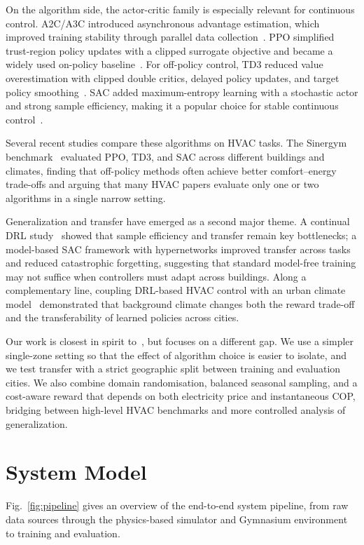 \documentclass[conference]{IEEEtran}
\begin{document}
On the algorithm side, the actor-critic family is especially relevant for continuous control. A2C/A3C introduced asynchronous advantage estimation, which improved training stability through parallel data collection~\cite{mnih2016a2c}. PPO simplified trust-region policy updates with a clipped surrogate objective and became a widely used on-policy baseline~\cite{schulman2017ppo}. For off-policy control, TD3 reduced value overestimation with clipped double critics, delayed policy updates, and target policy smoothing~\cite{fujimoto2018td3}. SAC added maximum-entropy learning with a stochastic actor and strong sample efficiency, making it a popular choice for stable continuous control~\cite{haarnoja2018sac}.

Several recent studies compare these algorithms on HVAC tasks. The Sinergym benchmark~\cite{manjavacas2024drl_hvac} evaluated PPO, TD3, and SAC across different buildings and climates, finding that off-policy methods often achieve better comfort--energy trade-offs and arguing that many HVAC papers evaluate only one or two algorithms in a single narrow setting.

Generalization and transfer have emerged as a second major theme. A continual DRL study~\cite{bekal2025continual_hvac} showed that sample efficiency and transfer remain key bottlenecks; a model-based SAC framework with hypernetworks improved transfer across tasks and reduced catastrophic forgetting, suggesting that standard model-free training may not suffice when controllers must adapt across buildings. Along a complementary line, coupling DRL-based HVAC control with an urban climate model~\cite{yu2025rl_urban_hvac} demonstrated that background climate changes both the reward trade-off and the transferability of learned policies across cities.

Our work is closest in spirit to~\cite{manjavacas2024drl_hvac}, but focuses on a different gap. We use a simpler single-zone setting so that the effect of algorithm choice is easier to isolate, and we test transfer with a strict geographic split between training and evaluation cities. We also combine domain randomisation, balanced seasonal sampling, and a cost-aware reward that depends on both electricity price and instantaneous COP, bridging between high-level HVAC benchmarks and more controlled analysis of generalization.

\section{System Model}
\label{sec:system-model}
Fig.~\ref{fig:pipeline} gives an overview of the end-to-end system pipeline,
from raw data sources through the physics-based simulator and Gymnasium
environment to training and evaluation.
\end{document}
